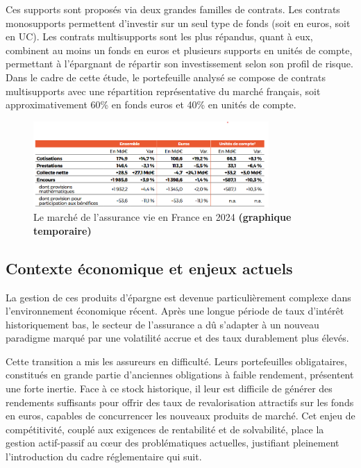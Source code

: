 Ces supports sont proposés via deux grandes familles de contrats. Les contrats monosupports permettent d'investir sur un seul type de fonds (soit en euros, soit en UC). Les contrats multisupports sont les plus répandus, quant à eux, combinent au moins un fonds en euros et plusieurs supports en unités de compte, permettant à l'épargnant de répartir son investissement selon son profil de risque. Dans le cadre de cette étude, le portefeuille analysé se compose de contrats multisupports avec une répartition représentative du marché français, soit approximativement 60\% en fonds euros et 40\% en unités de compte.
\begin{figure}[H]
    \centering
    \includegraphics[width=0.8\textwidth]{images/2_chapitres/chapitre1/assurance-vie-stats.png}
    \caption{Le marché de l'assurance vie en France en 2024 \textbf{(graphique temporaire)}}
    \label{fig:marches_assurance_vie}
\end{figure}

\subsection{Contexte économique et enjeux actuels}

La gestion de ces produits d'épargne est devenue particulièrement complexe dans l'environnement économique récent. Après une longue période de taux d'intérêt historiquement bas, le secteur de l'assurance a dû s'adapter à un nouveau paradigme marqué par une volatilité accrue et des taux durablement plus élevés.

Cette transition a mis les assureurs en difficulté. Leurs portefeuilles obligataires, constitués en grande partie d'anciennes obligations à faible rendement, présentent une forte inertie. Face à ce stock historique, il leur est difficile de générer des rendements suffisants pour offrir des taux de revalorisation attractifs sur les fonds en euros, capables de concurrencer les nouveaux produits de marché. Cet enjeu de compétitivité, couplé aux exigences de rentabilité et de solvabilité, place la gestion actif-passif au cœur des problématiques actuelles, justifiant pleinement l'introduction du cadre réglementaire qui suit.

